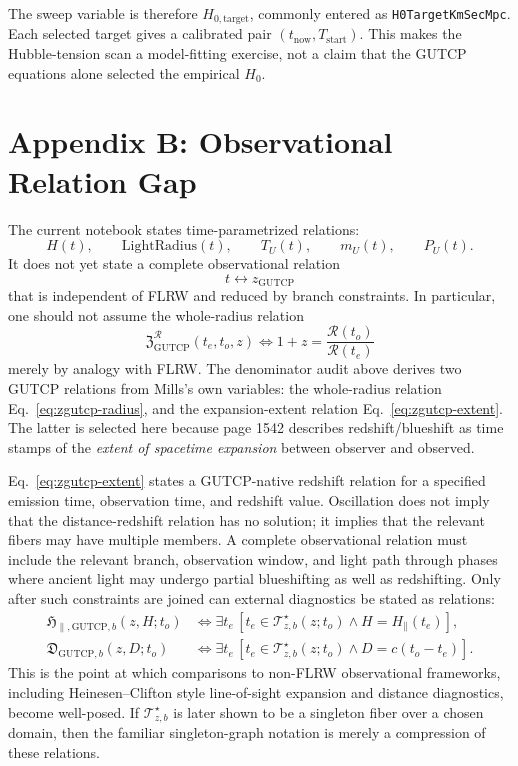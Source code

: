 \documentclass[11pt]{article}
\newcommand{\RG}{\mathcal{R}}
\newcommand{\ZRel}{\mathfrak{Z}_{\mathrm{GUTCP}}}
\begin{document}
The sweep variable is therefore \(H_{0,\mathrm{target}}\), commonly entered as
\texttt{H0TargetKmSecMpc}.  Each selected target gives a calibrated pair
\((t_{\mathrm{now}},T_{\mathrm{start}})\).  This makes the Hubble-tension scan a
model-fitting exercise, not a claim that the GUTCP equations alone selected the
empirical \(H_0\).

\section*{Appendix B: Observational Relation Gap}

The current notebook states time-parametrized relations:
\[
H(t),\qquad \mathrm{LightRadius}(t),\qquad T_U(t),\qquad m_U(t),\qquad P_U(t).
\]
It does not yet state a complete observational relation
\[
t \longleftrightarrow z_{\mathrm{GUTCP}}
\]
that is independent of FLRW and reduced by branch constraints.  In particular,
one should not assume the whole-radius relation
\[
\ZRel^{\RG}(t_e,t_o,z)\Longleftrightarrow
1+z=\frac{\RG(t_o)}{\RG(t_e)}
\]
merely by analogy with FLRW.  The denominator audit above derives two GUTCP
relations from Mills's own variables: the whole-radius relation
Eq.~\eqref{eq:zgutcp-radius}, and the expansion-extent relation
Eq.~\eqref{eq:zgutcp-extent}.  The latter is selected here because page 1542
describes redshift/blueshift as time stamps of the \emph{extent of spacetime
expansion} between observer and observed.

Eq.~\eqref{eq:zgutcp-extent} states a GUTCP-native redshift relation for a
specified emission time, observation time, and redshift value.  Oscillation does
not imply that the distance-redshift relation has no solution; it implies that
the relevant fibers may have multiple members.  A complete observational
relation must include the relevant branch, observation window, and light path
through phases where ancient light may undergo partial blueshifting as well as
redshifting.  Only after such constraints are joined can external diagnostics be
stated as relations:
\begin{align}
\mathfrak{H}_{\parallel,\mathrm{GUTCP},b}(z,H;t_o)
&\Longleftrightarrow
\exists t_e\,
\left[
t_e\in\mathcal{T}_{z,b}^{\star}(z;t_o)\wedge H=H_{\parallel}(t_e)
\right],
\\
\mathfrak{D}_{\mathrm{GUTCP},b}(z,D;t_o)
&\Longleftrightarrow
\exists t_e\,
\left[
t_e\in\mathcal{T}_{z,b}^{\star}(z;t_o)\wedge D=c(t_o-t_e)
\right].
\end{align}
This is the point at which comparisons to non-FLRW observational frameworks,
including Heinesen--Clifton style line-of-sight expansion and distance
diagnostics, become well-posed.  If \(\mathcal{T}_{z,b}^{\star}\) is later
shown to be a singleton fiber over a chosen domain, then the familiar
singleton-graph notation is merely a compression of these relations.
\end{document}
